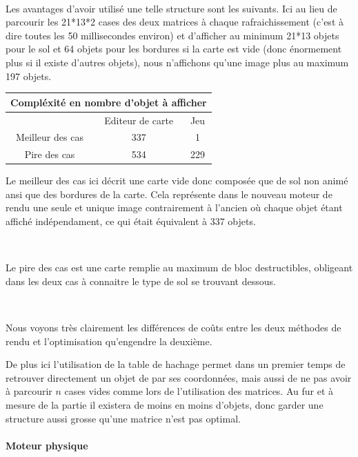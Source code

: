 			$\,$
			
			\newpage

			Les avantages d'avoir utilisé une telle structure sont les suivants. Ici au
			lieu de parcourir les 21*13*2 cases des deux matrices à chaque rafraichissement
			(c'est à dire toutes les 50 millisecondes environ) et d'afficher au minimum
			21*13 objets pour le sol et 64 objets pour les bordures si la carte est vide
			(donc énormement plus si il existe d'autres objets), nous n'affichons qu'une
			image plus au maximum 197 objets.
			
			\begin{center}
				\begin{tabular}{|c|c|c|} \hline
				\multicolumn{3}{c}{Compléxité en nombre d'objet à afficher} \\\hline
				  & Editeur de carte & Jeu    \\\hline 
				Meilleur des cas & 337 & 1    \\\hline
				Pire des cas     & 534 & 229  \\\hline		
				\end{tabular}
			\end{center}
			
			Le meilleur des cas ici décrit une carte vide donc composée que de sol non
			animé ansi que des bordures de la carte. Cela représente dans le nouveau
			moteur de rendu une seule et unique image contrairement à l'ancien où chaque
			objet étant affiché indépendament, ce qui était équivalent à 337 objets.
			
			$\,$
			
			Le pire des cas est une carte remplie au maximum de bloc destructibles,
			obligeant dans les deux cas à connaitre le type de sol se trouvant dessous.
			
			$\,$
			
			Nous voyons très clairement les différences de coûts entre les deux méthodes
			de rendu et l'optimisation qu'engendre la deuxième.
			
			De plus ici l'utilisation de la table de hachage permet dans un premier temps de
			retrouver directement un objet de par ses coordonnées, mais aussi de ne pas
			avoir à parcourir $n$ cases vides comme lors de l'utilisation des matrices.
			Au fur et à mesure de la partie il existera de moins en moins d'objets,
			donc garder une structure aussi grosse qu'une matrice n'est pas optimal.
		
		\paragraph{Moteur physique\\}
		
